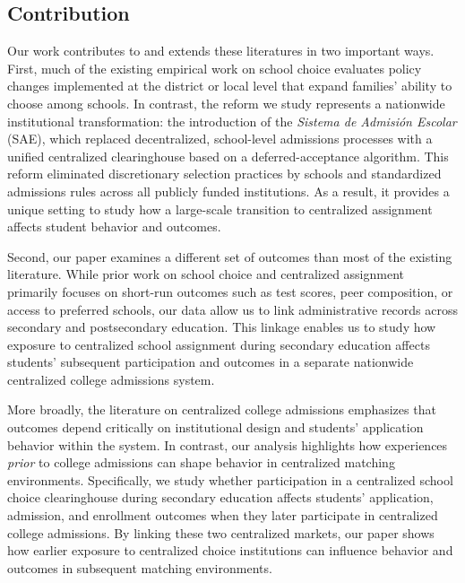 \subsection{Contribution}
Our work contributes to and extends these literatures in two important ways. First, much of the existing empirical work on school choice evaluates policy changes implemented at the district or local level that expand families' ability to choose among schools. In contrast, the reform we study represents a nationwide institutional transformation: the introduction of the \emph{Sistema de Admisión Escolar} (SAE), which replaced decentralized, school-level admissions processes with a unified centralized clearinghouse based on a deferred-acceptance algorithm. This reform eliminated discretionary selection practices by schools and standardized admissions rules across all publicly funded institutions. As a result, it provides a unique setting to study how a large-scale transition to centralized assignment affects student behavior and outcomes.

Second, our paper examines a different set of outcomes than most of the existing literature. While prior work on school choice and centralized assignment primarily focuses on short-run outcomes such as test scores, peer composition, or access to preferred schools, our data allow us to link administrative records across secondary and postsecondary education. This linkage enables us to study how exposure to centralized school assignment during secondary education affects students’ subsequent participation and outcomes in a separate nationwide centralized college admissions system.

More broadly, the literature on centralized college admissions emphasizes that outcomes depend critically on institutional design and students’ application behavior within the system. In contrast, our analysis highlights how experiences \emph{prior} to college admissions can shape behavior in centralized matching environments. Specifically, we study whether participation in a centralized school choice clearinghouse during secondary education affects students’ application, admission, and enrollment outcomes when they later participate in centralized college admissions. By linking these two centralized markets, our paper shows how earlier exposure to centralized choice institutions can influence behavior and outcomes in subsequent matching environments.


